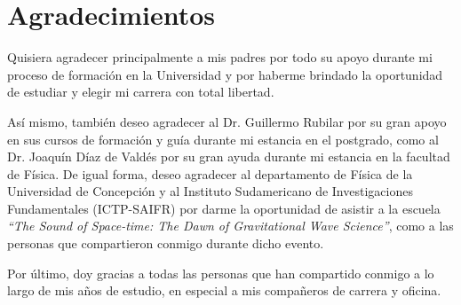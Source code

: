 \chapter*{Agradecimientos}

Quisiera agradecer principalmente a mis padres por todo su apoyo durante mi proceso de formación en la Universidad y por haberme brindado la oportunidad de estudiar y elegir mi carrera con total libertad.

Así mismo, también deseo agradecer al Dr. Guillermo Rubilar por su gran apoyo en sus cursos de formación y guía durante mi estancia en el postgrado, como al Dr. Joaquín Díaz de Valdés por su gran ayuda durante mi estancia en la facultad de Física. De igual forma, deseo agradecer al departamento de Física de la Universidad de Concepción y al Instituto Sudamericano de Investigaciones Fundamentales (ICTP-SAIFR) por darme la oportunidad de asistir a la escuela \textit{``The Sound of Space-time: The Dawn of Gravitational Wave Science''}, como a las personas que compartieron conmigo durante dicho evento.

Por último, doy gracias a todas las personas que han compartido conmigo a lo largo de mis años de estudio, en especial a mis compañeros de carrera y oficina.